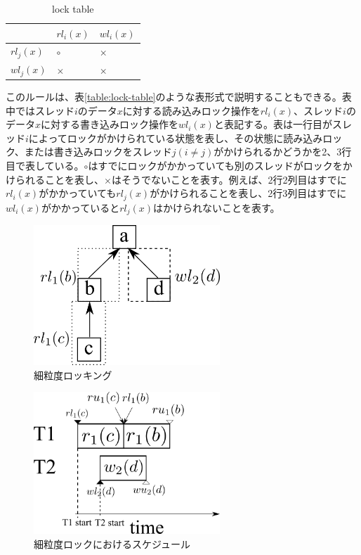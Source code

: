\documentclass[a4paper]{jreport}	%
\begin{document}
\begin{table}[h!]
\centering
\begin{tabular}{ | m{1cm} | m{1cm} | m{1cm} | } 
  \hline
  & $rl_i(x)$ & $wl_i(x)$ \\ 
  \hline
  $rl_j(x)$ & $\circ$ & $\times$ \\ 
  \hline
  $wl_j(x)$ &  $\times$ & $\times$ \\ 
  \hline
\end{tabular}	
\caption{lock table}
\label{table:各ロックの互換性}
\end{table}


このルールは、表\ref{table:lock-table}のような表形式で説明することもできる。表中ではスレッド$i$のデータ$x$に対する読み込みロック操作を$rl_i(x)$、スレッド$i$のデータ$x$に対する書き込みロック操作を$wl_i(x)$と表記する。表は一行目がスレッド$i$によってロックがかけられている状態を表し、その状態に読み込みロック、または書き込みロックをスレッド$j(i \neq j)$がかけられるかどうかを2、3行目で表している。$\circ$はすでにロックがかかっていても別のスレッドがロックをかけられることを表し、$\times$はそうでないことを表す。例えば、2行2列目はすでに$rl_i(x)$がかかっていても$rl_j(x)$がかけられることを表し、2行3列目はすでに$wl_i(x)$がかかっていると$rl_j(x)$はかけられないことを表す。

\begin{figure}[h] 
\centering
\includegraphics[width=7cm]{high-gran-lock}
\caption{細粒度ロッキング}
\label{fig:high-gran-lock}
\end{figure}


\begin{figure}[h] 
\centering
\includegraphics[width=7cm]{high-gran-time}
\caption{細粒度ロックにおけるスケジュール}
\label{fig:high-gran-time}
\end{figure}
\end{document}
